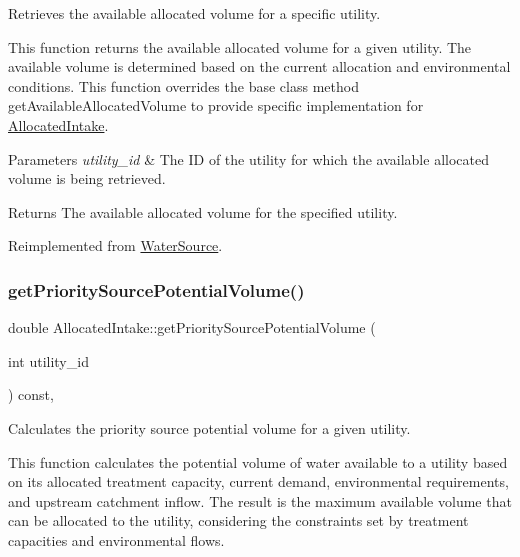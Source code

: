 Retrieves the available allocated volume for a specific utility. 

This function returns the available allocated volume for a given utility. The available volume is determined based on the current allocation and environmental conditions. This function overrides the base class method {\ttfamily get\+Available\+Allocated\+Volume} to provide specific implementation for {\ttfamily \mbox{\hyperlink{classAllocatedIntake}{Allocated\+Intake}}}.


\begin{DoxyParams}{Parameters}
{\em utility\+\_\+id} & The ID of the utility for which the available allocated volume is being retrieved.\\
\hline
\end{DoxyParams}
\begin{DoxyReturn}{Returns}
The available allocated volume for the specified utility. 
\end{DoxyReturn}


Reimplemented from \mbox{\hyperlink{classWaterSource_ad4667296dc6b6dabc36b871529ca2749}{Water\+Source}}.

\mbox{\label{classAllocatedIntake_abbea26f2adac6c9f9e3bdcdf1aead55d}} 
\subsubsection{\texorpdfstring{get\+Priority\+Source\+Potential\+Volume()}{getPrioritySourcePotentialVolume()}}
{\footnotesize\ttfamily double Allocated\+Intake\+::get\+Priority\+Source\+Potential\+Volume (\begin{DoxyParamCaption}\item[{int}]{utility\+\_\+id }\end{DoxyParamCaption}) const\hspace{0.3cm}{\ttfamily [override]}, {\ttfamily [virtual]}}



Calculates the priority source potential volume for a given utility. 

This function calculates the potential volume of water available to a utility based on its allocated treatment capacity, current demand, environmental requirements, and upstream catchment inflow. The result is the maximum available volume that can be allocated to the utility, considering the constraints set by treatment capacities and environmental flows.

